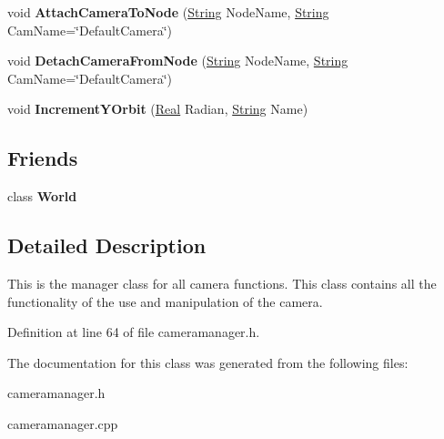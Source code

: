 \begin{DoxyCompactItemize}
\item 
\hypertarget{classphys_1_1CameraManager_a1cde365b6cab80a33ddf7046489f7af9}{
void {\bfseries AttachCameraToNode} (\hyperlink{namespacephys_aa03900411993de7fbfec4789bc1d392e}{String} NodeName, \hyperlink{namespacephys_aa03900411993de7fbfec4789bc1d392e}{String} CamName=\char`\"{}DefaultCamera\char`\"{})}
\label{d9/d91/classphys_1_1CameraManager_a1cde365b6cab80a33ddf7046489f7af9}

\item 
\hypertarget{classphys_1_1CameraManager_a5137bdb9dec706fa0fafec665d4f71c8}{
void {\bfseries DetachCameraFromNode} (\hyperlink{namespacephys_aa03900411993de7fbfec4789bc1d392e}{String} NodeName, \hyperlink{namespacephys_aa03900411993de7fbfec4789bc1d392e}{String} CamName=\char`\"{}DefaultCamera\char`\"{})}
\label{d9/d91/classphys_1_1CameraManager_a5137bdb9dec706fa0fafec665d4f71c8}

\item 
\hypertarget{classphys_1_1CameraManager_a82001f0874a090717ced3fbe78ce795b}{
void {\bfseries IncrementYOrbit} (\hyperlink{namespacephys_af7eb897198d265b8e868f45240230d5f}{Real} Radian, \hyperlink{namespacephys_aa03900411993de7fbfec4789bc1d392e}{String} Name)}
\label{d9/d91/classphys_1_1CameraManager_a82001f0874a090717ced3fbe78ce795b}

\end{DoxyCompactItemize}
\subsection*{Friends}
\begin{DoxyCompactItemize}
\item 
\hypertarget{classphys_1_1CameraManager_a7b4bcdf992c21ae83363f25df05b1d25}{
class {\bfseries World}}
\label{d9/d91/classphys_1_1CameraManager_a7b4bcdf992c21ae83363f25df05b1d25}

\end{DoxyCompactItemize}


\subsection{Detailed Description}
This is the manager class for all camera functions. This class contains all the functionality of the use and manipulation of the camera. 

Definition at line 64 of file cameramanager.h.



The documentation for this class was generated from the following files:\begin{DoxyCompactItemize}
\item 
cameramanager.h\item 
cameramanager.cpp\end{DoxyCompactItemize}
